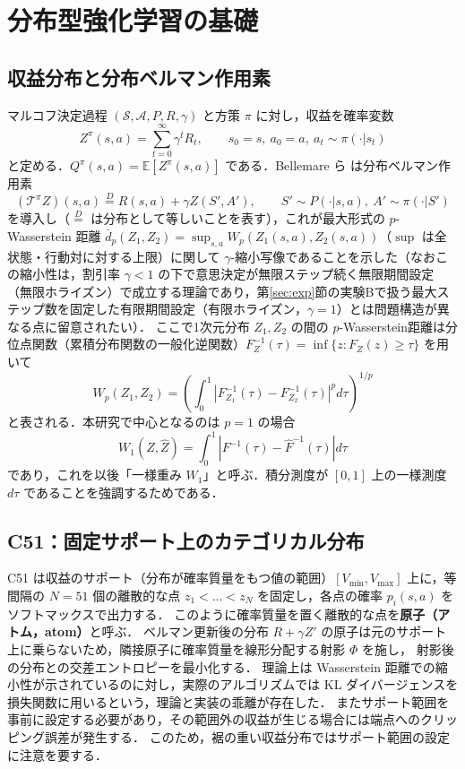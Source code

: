 \documentclass[a4paper,10pt]{jsarticle}
\theoremstyle{definition}
\newcommand{\Wone}{W_1}
\newcommand{\Finv}{F^{-1}}
\newcommand{\Fhinv}{\hat{F}^{-1}}
\newcommand{\E}{\mathbb{E}}
\begin{document}
\section{分布型強化学習の基礎}
\label{sec:drl}

\subsection{収益分布と分布ベルマン作用素}
マルコフ決定過程 $(\mathcal{S},\mathcal{A},P,R,\gamma)$ と方策 $\pi$ に対し，収益を確率変数
\begin{equation}
  Z^\pi(s,a)=\sum_{t=0}^{\infty}\gamma^t R_t,\qquad s_0=s,\ a_0=a,\ a_t\sim\pi(\cdot|s_t)
\end{equation}
と定める．$Q^\pi(s,a)=\E[Z^\pi(s,a)]$ である．Bellemare ら \cite{bellemare2017c51} は分布ベルマン作用素
\begin{equation}
  (\mathcal{T}^\pi Z)(s,a)\overset{D}{=}R(s,a)+\gamma Z(S',A'),\qquad S'\sim P(\cdot|s,a),\ A'\sim\pi(\cdot|S')
\end{equation}
を導入し（$\overset{D}{=}$ は分布として等しいことを表す），これが最大形式の $p$-Wasserstein 距離 $\bar d_p(Z_1,Z_2)=\sup_{s,a}W_p(Z_1(s,a),Z_2(s,a))$（$\sup$ は全状態・行動対に対する上限）に関して
$\gamma$-縮小写像であることを示した（なおこの縮小性は，割引率 $\gamma<1$ の下で意思決定が無限ステップ続く無限期間設定（無限ホライズン）で成立する理論であり，第\ref{sec:exp}節の実験Bで扱う最大ステップ数を固定した有限期間設定（有限ホライズン，$\gamma=1$）とは問題構造が異なる点に留意されたい）．
ここで1次元分布 $Z_1,Z_2$ の間の $p$-Wasserstein距離は分位点関数（累積分布関数の一般化逆関数）$F^{-1}_{Z}(\tau)=\inf\{z:F_Z(z)\ge\tau\}$ を用いて
\begin{equation}
  W_p(Z_1,Z_2)=\left(\int_0^1\left|F_{Z_1}^{-1}(\tau)-F_{Z_2}^{-1}(\tau)\right|^p d\tau\right)^{1/p}
  \label{eq:wp}
\end{equation}
と表される．本研究で中心となるのは $p=1$ の場合
\begin{equation}
  \Wone(Z,\hat Z)=\int_0^1\left|\Finv(\tau)-\Fhinv(\tau)\right|d\tau
  \label{eq:w1}
\end{equation}
であり，これを以後「一様重み $\Wone$」と呼ぶ．積分測度が $[0,1]$ 上の一様測度 $d\tau$ であることを強調するためである．

\subsection{C51：固定サポート上のカテゴリカル分布}
C51 \cite{bellemare2017c51} は収益のサポート（分布が確率質量をもつ値の範囲）$[V_{\min},V_{\max}]$ 上に，等間隔の $N=51$ 個の離散的な点
$z_1<\dots<z_N$ を固定し，各点の確率 $p_i(s,a)$ をソフトマックスで出力する．
このように確率質量を置く離散的な点を\textbf{原子（アトム，atom）}と呼ぶ．
ベルマン更新後の分布 $R+\gamma Z'$ の原子は元のサポート上に乗らないため，隣接原子に確率質量を線形分配する射影 $\Phi$ を施し，
射影後の分布との交差エントロピーを最小化する．
理論上は Wasserstein 距離での縮小性が示されているのに対し，実際のアルゴリズムでは KL ダイバージェンスを損失関数に用いるという，理論と実装の乖離が存在した．
またサポート範囲を事前に設定する必要があり，その範囲外の収益が生じる場合には端点へのクリッピング誤差が発生する．
このため，裾の重い収益分布ではサポート範囲の設定に注意を要する．
\end{document}
